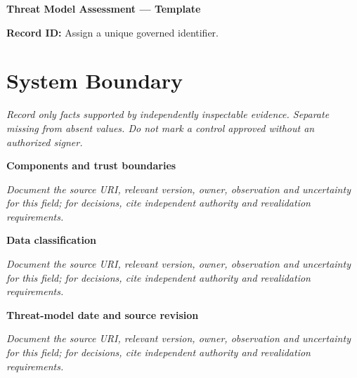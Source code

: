 \documentclass[11pt,letterpaper]{article}
\begin{document}
\begin{center}{\LARGE\bfseries Threat Model Assessment --- Template}\par
\vspace{4pt}{\small Guided authoring instrument (not a completed assessment)}\par
\end{center}
\noindent\textbf{Record ID:} Assign a unique governed identifier.\par
\section{System Boundary}
\noindent\emph{Record only facts supported by independently inspectable evidence. Separate missing from absent values. Do not mark a control approved without an authorized signer.}\par
\noindent\textbf{Components and trust boundaries}\par
\noindent\emph{Document the source URI, relevant version, owner, observation and uncertainty for this field; for decisions, cite independent authority and revalidation requirements.}\par\medskip
\noindent\textbf{Data classification}\par
\noindent\emph{Document the source URI, relevant version, owner, observation and uncertainty for this field; for decisions, cite independent authority and revalidation requirements.}\par\medskip
\noindent\textbf{Threat-model date and source revision}\par
\noindent\emph{Document the source URI, relevant version, owner, observation and uncertainty for this field; for decisions, cite independent authority and revalidation requirements.}\par\medskip
\end{document}
